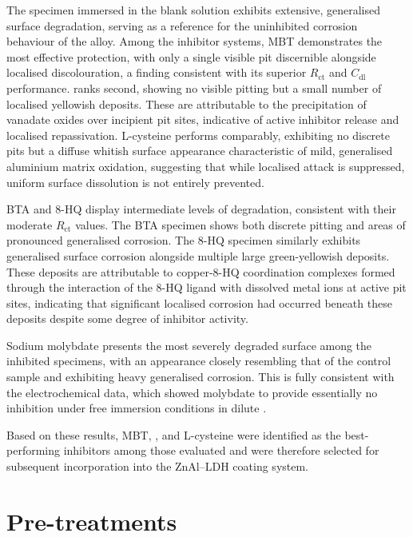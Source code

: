 \documentclass[11pt,twoside,a4paper,final]{report}
\begin{document}
\vspace{0.5cm}

The specimen immersed in the blank  solution exhibits extensive, generalised surface degradation, serving as a reference for the uninhibited corrosion behaviour of the alloy. Among the inhibitor systems, MBT demonstrates the most effective protection, with only a single visible pit discernible alongside localised discolouration, a finding consistent with its superior $R_{\text{ct}}$ and $C_{\text{dl}}$ performance.  ranks second, showing no visible pitting but a small number of localised yellowish deposits. These are attributable to the precipitation of vanadate oxides over incipient pit sites, indicative of active inhibitor release and localised repassivation. L-cysteine performs comparably, exhibiting no discrete pits but a diffuse whitish surface appearance characteristic of mild, generalised aluminium matrix oxidation, suggesting that while localised attack is suppressed, uniform surface dissolution is not entirely prevented.

BTA and 8-HQ display intermediate levels of degradation, consistent with their moderate $R_{\text{ct}}$ values. The BTA specimen shows both discrete pitting and areas of pronounced generalised corrosion. The 8-HQ specimen similarly exhibits generalised surface corrosion alongside multiple large green-yellowish deposits. These deposits are attributable to copper-8-HQ coordination complexes formed through the interaction of the 8-HQ ligand with dissolved metal ions at active pit sites, indicating that significant localised corrosion had occurred beneath these deposits despite some degree of inhibitor activity.

Sodium molybdate presents the most severely degraded surface among the inhibited specimens, with an appearance closely resembling that of the control sample and exhibiting heavy generalised corrosion. This is fully consistent with the electrochemical data, which showed molybdate to provide essentially no inhibition under free immersion conditions in dilute .

Based on these results, MBT, , and L-cysteine were identified as the best-performing inhibitors among those evaluated and were therefore selected for subsequent incorporation into the ZnAl--LDH coating system.

\section{Pre-treatments}
\label{sec:results_pretreatments}
\end{document}
